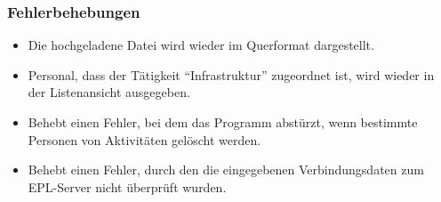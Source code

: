 \subsubsection{Fehlerbehebungen}
\begin{itemize}
  \item
  Die hochgeladene Datei wird wieder im Querformat dargestellt.
  \item
  Personal, dass der Tätigkeit "`Infrastruktur"' zugeordnet ist, wird wieder in der Listenansicht ausgegeben.
  \item
  Behebt einen Fehler, bei dem das Programm abstürzt, wenn bestimmte Personen von Aktivitäten gelöscht werden.
  \item
  Behebt einen Fehler, durch den die eingegebenen Verbindungsdaten zum EPL-Server nicht überprüft wurden.
\end{itemize}

